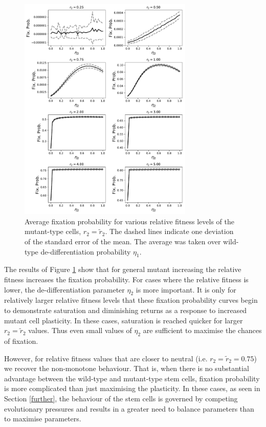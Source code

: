 \documentclass[12pt]{article}
\begin{document}
\begin{figure}[H]
\begin{center}
\includegraphics[width=0.74\textwidth]{avg_eta1_r2_stackplot.pdf}
\end{center}
\caption{Average fixation probability for various relative fitness levels of the mutant-type cells, $r_2=\tilde{r}_2$. The dashed lines indicate one deviation of the standard error of the mean. The average was taken over wild-type de-differentiation probability $\eta_1$.}\label{r2_stack}
\end{figure}

The results of Figure \ref{r2_stack} show that for general mutant increasing the relative fitness increases the fixation probability. For cases where the relative fitness is lower, the de-differentiation parameter $\eta_2$ is more important. It is only for relatively larger relative fitness levels that  these fixation probability curves begin to demonstrate saturation and diminishing returns as a response to increased mutant cell plasticity.  In these cases, saturation is reached quicker for larger $r_2=\tilde{r}_2$ values. Thus even small values of $\eta_2$ are sufficient to maximise the chances of fixation. 

However, for relative fitness values that are closer to neutral (i.e. $r_2=\tilde{r}_2=0.75$) we recover the non-monotone behaviour. That is, when there is no substantial advantage between the wild-type and mutant-type stem cells, fixation probability is more complicated than just maximising the plasticity. In these cases, as seen in Section \ref{further}, the behaviour of the stem cells is governed by competing evolutionary pressures and results in a greater need to balance parameters than to maximise parameters.
\end{document}
